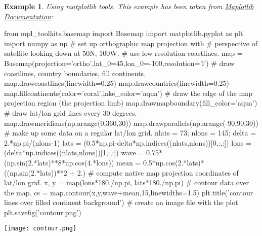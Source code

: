 \documentclass[12pt,a4paper]{report}
\newtheorem{example}{Example}
\begin{document}
\begin{example}
Using matplotlib tools. This example has been taken from \href{https://matplotlib.org/basemap/users/examples.html}{Maplotlib Documentation}:
\end{example}

\begin{python}
from mpl_toolkits.basemap import Basemap
import matplotlib.pyplot as plt
import numpy as np
# set up orthographic map projection with
# perspective of satellite looking down at 50N, 100W.
# use low resolution coastlines.
map = Basemap(projection='ortho',lat_0=45,lon_0=-100,resolution='l')
# draw coastlines, country boundaries, fill continents.
map.drawcoastlines(linewidth=0.25)
map.drawcountries(linewidth=0.25)
map.fillcontinents(color='coral',lake_color='aqua')
# draw the edge of the map projection region (the projection limb)
map.drawmapboundary(fill_color='aqua')
# draw lat/lon grid lines every 30 degrees.
map.drawmeridians(np.arange(0,360,30))
map.drawparallels(np.arange(-90,90,30))
# make up some data on a regular lat/lon grid.
nlats = 73; nlons = 145; delta = 2.*np.pi/(nlons-1)
lats = (0.5*np.pi-delta*np.indices((nlats,nlons))[0,:,:])
lons = (delta*np.indices((nlats,nlons))[1,:,:])
wave = 0.75*(np.sin(2.*lats)**8*np.cos(4.*lons))
mean = 0.5*np.cos(2.*lats)*((np.sin(2.*lats))**2 + 2.)
# compute native map projection coordinates of lat/lon grid.
x, y = map(lons*180./np.pi, lats*180./np.pi)
# contour data over the map.
cs = map.contour(x,y,wave+mean,15,linewidths=1.5)
plt.title('contour lines over filled continent background')
# create an image file with the plot
plt.savefig('contour.png')
\end{python}

\begin{center}
\texttt{[image: contour.png]}
\end{center}
\end{document}
